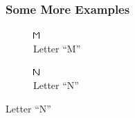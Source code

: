 \documentclass[a4paper,12pt]{report}
\begin{document}
\begin{figure}
\subsubsection*{Some More Examples}
        \centering
        \begin{subfigure}[h!]{0.3\textwidth}
                \includegraphics[width=\textwidth]{M.png}
                \caption{Letter ``M''}
                
        \end{subfigure}
        \quad \quad \quad \quad \quad \quad
        \begin{subfigure}[h!]{0.3\textwidth}
                \includegraphics[width=\textwidth]{N.png}
                \caption{Letter ``N''}
                

\end{subfigure}
\end{figure}
\end{document}
